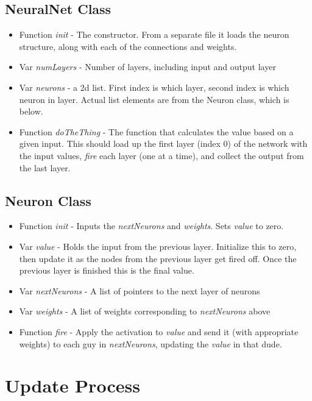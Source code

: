 \documentclass{article}[12pt]
\begin{document}
\subsection{NeuralNet Class}

\begin{itemize}
\item Function \emph{init} - The constructor. From a separate file it loads the neuron structure, along with each of the connections and weights.
\item Var \emph{numLayers} - Number of layers, including input and output layer
\item Var \emph{neurons} - a 2d list. First index is which layer, second index is which neuron in layer. Actual list elements are from the Neuron class, which is below.
\item Function \emph{doTheThing} - The function that calculates the value based on a given input. This should load up the first layer (index 0) of the network with the input values, \emph{fire} each layer (one at a time), and collect the output from the last layer.
\end{itemize}

\subsection{Neuron Class}

\begin{itemize}
\item Function \emph{init} - Inputs the \emph{nextNeurons} and \emph{weights}. Sets \emph{value} to zero.
\item Var \emph{value} - Holds the input from the previous layer. Initialize this to zero, then update it as the nodes from the previous layer get fired off. Once the previous layer is finished this is the final value.
\item Var \emph{nextNeurons} - A list of pointers to the next layer of neurons
\item Var \emph{weights} - A list of weights corresponding to \emph{nextNeurons} above
\item Function \emph{fire} - Apply the activation to \emph{value} and send it (with appropriate weights) to each guy in \emph{nextNeurons}, updating the \emph{value} in that dude.
\end{itemize}

\section{Update Process}
\end{document}
